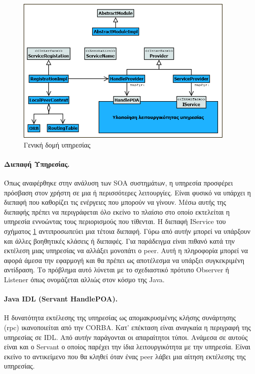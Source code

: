 \begin{figure}[htbp]
  \begin{center}
    \includegraphics[width=0.95\textwidth]{Figures/Architecture/General_service_structure.png}
  \end{center}
  \caption{Γενική δομή υπηρεσίας}
  \label{fig:ServiceStructure}
\end{figure}

\paragraph{Διεπαφή Υπηρεσίας.} Όπως αναφέρθηκε στην ανάλυση των 
SOA συστημάτων, η υπηρεσία προσφέρει πρόσβαση στον χρήστη σε μια ή 
περισσότερες λειτουργίες. Είναι φυσικό να υπάρχει η διεπαφή που καθορίζει 
τις ενέργειες που μπορούν να γίνουν. Μέσω αυτής της διεπαφής πρέπει να 
περιγράφεται όλο εκείνο το πλαίσιο στο οποίο εκτελείται η υπηρεσία 
εννοώντας τους περιορισμούς που τίθενται. Η διεπαφή IService του σχήματος 
\ref{fig:ServiceStructure} αντιπροσωπεύει μια τέτοια διεπαφή. Γύρω από αυτήν 
μπορεί να υπάρξουν και άλλες βοηθητικές κλάσεις ή διεπαφές. Για παράδειγμα 
είναι πιθανό κατά την εκτέλεση μιας υπηρεσίας να αλλάξει μονοπάτι ο peer. 
Αυτή η πληροφορία μπορεί να αφορά άμεσα την εφαρμογή και θα πρέπει ως 
αποτέλεσμα να υπάρξει συγκεκριμένη αντίδραση. Το πρόβλημα αυτό λύνεται 
με το σχεδιαστικό πρότυπο Observer \citep{GoF} ή Listener όπως ονομάζεται 
αλλιώς στον κόσμο της Java.

\paragraph{Java IDL (Servant HandlePOA).} Η δυνατότητα εκτέλεσης της 
υπηρεσίας ως απομακρυσμένης κλήσης συνάρτησης (rpc) ικανοποιείται από την 
CORBA. Κατ' επέκταση είναι αναγκαία η περιγραφή της υπηρεσίας σε IDL. Από 
αυτήν παράγονται οι απαραίτητοι τύποι. Ανάμεσα σε αυτούς είναι και ο Servant 
ο οποίος παρέχει την ίδια λειτουργικότητα με την υπηρεσία. Είναι εκείνο το 
αντικείμενο που θα κληθεί όταν ένας peer λάβει μια αίτηση εκτέλεσης της 
υπηρεσίας.

